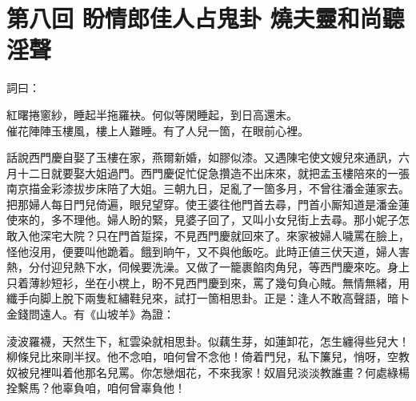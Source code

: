 
\chapter*{第八回 盼情郎佳人占鬼卦 燒夫靈和尚聽淫聲}


詞曰：

\begin{myquote} 
紅曙捲窻紗，睡起半拖羅袂。何似等閑睡起，到日高還未。\\催花陣陣玉樓風，樓上人難睡。有了人兒一箇，在眼前心裡。
\end{myquote} 

話說西門慶自娶了玉樓在家，燕爾新婚，如膠似漆。又遇陳宅使文嫂兒來通訊，六月十二日就要娶大姐過門。西門慶促忙促急攢造不出床來，就把孟玉樓陪來的一張南京描金彩漆拔步床陪了大姐。三朝九日，足亂了一箇多月，不曾往潘金蓮家去。把那婦人每日門兒倚遍，眼兒望穿。使王婆往他門首去尋，門首小厮知道是潘金蓮使來的，多不理他。婦人盼的緊，見婆子回了，又叫小女兒街上去尋。那小妮子怎敢入他深宅大院？只在門首踅探，不見西門慶就回來了。來家被婦人噦罵在臉上，怪他沒用，便要叫他跪着。餓到晌午，又不與他飯吃。此時正値三伏天道，婦人害熱，分付迎兒熱下水，伺候要洗澡。又做了一籠裹餡肉角兒，等西門慶來吃。身上只着薄紗短衫，坐在小櫈上，盼不見西門慶到來，罵了幾句負心賊。無情無緒，用纖手向脚上脫下兩隻紅繡鞋兒來，試打一箇相思卦。正是：逢人不敢高聲語，暗卜金錢問遠人。有《山坡羊》為證：

\begin{myquote} 
淩波羅襪，天然生下，紅雲染就相思卦。似藕生芽，如蓮卸花，怎生纏得些兒大！柳條兒比來剛半扠。他不念咱，咱何曾不念他！倚着門兒，私下簾兒，悄呀，空教奴被兒裡叫着他那名兒罵。你怎戀烟花，不來我家！奴眉兒淡淡教誰畫？何處綠楊拴繫馬？他辜負咱，咱何曾辜負他！
\end{myquote} 

